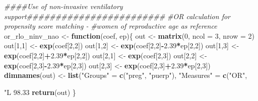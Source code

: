\documentclass[
]{article}
\newenvironment{Shaded}{\begin{snugshade}}{\end{snugshade}}
\newcommand{\CommentTok}[1]{\textcolor[rgb]{0.56,0.35,0.01}{\textit{#1}}}
\newcommand{\ControlFlowTok}[1]{\textcolor[rgb]{0.13,0.29,0.53}{\textbf{#1}}}
\newcommand{\DataTypeTok}[1]{\textcolor[rgb]{0.13,0.29,0.53}{#1}}
\newcommand{\DecValTok}[1]{\textcolor[rgb]{0.00,0.00,0.81}{#1}}
\newcommand{\FloatTok}[1]{\textcolor[rgb]{0.00,0.00,0.81}{#1}}
\newcommand{\KeywordTok}[1]{\textcolor[rgb]{0.13,0.29,0.53}{\textbf{#1}}}
\newcommand{\NormalTok}[1]{#1}
\newcommand{\OperatorTok}[1]{\textcolor[rgb]{0.81,0.36,0.00}{\textbf{#1}}}
\newcommand{\StringTok}[1]{\textcolor[rgb]{0.31,0.60,0.02}{#1}}
\begin{document}
\begin{Shaded}
\begin{Highlighting}[]
\CommentTok{####Use of non-invasive ventilatory support########################}
\CommentTok{#OR calculation for propensity score matching -}
\CommentTok{#women of reproductive age as reference}
\NormalTok{or_rlo_ninv_nao <-}\StringTok{ }\ControlFlowTok{function}\NormalTok{(coef, ep)\{}
\NormalTok{  out <-}\StringTok{ }\KeywordTok{matrix}\NormalTok{(}\DecValTok{0}\NormalTok{, }\DataTypeTok{ncol =} \DecValTok{3}\NormalTok{, }\DataTypeTok{nrow =} \DecValTok{2}\NormalTok{)}
\NormalTok{  out[}\DecValTok{1}\NormalTok{,}\DecValTok{1}\NormalTok{] <-}\StringTok{ }\KeywordTok{exp}\NormalTok{(coef[}\DecValTok{2}\NormalTok{,}\DecValTok{2}\NormalTok{])}
\NormalTok{  out[}\DecValTok{1}\NormalTok{,}\DecValTok{2}\NormalTok{] <-}\StringTok{ }\KeywordTok{exp}\NormalTok{(coef[}\DecValTok{2}\NormalTok{,}\DecValTok{2}\NormalTok{]}\OperatorTok{-}\FloatTok{2.39}\OperatorTok{*}\NormalTok{ep[}\DecValTok{2}\NormalTok{,}\DecValTok{2}\NormalTok{])}
\NormalTok{  out[}\DecValTok{1}\NormalTok{,}\DecValTok{3}\NormalTok{] <-}\StringTok{ }\KeywordTok{exp}\NormalTok{(coef[}\DecValTok{2}\NormalTok{,}\DecValTok{2}\NormalTok{]}\OperatorTok{+}\FloatTok{2.39}\OperatorTok{*}\NormalTok{ep[}\DecValTok{2}\NormalTok{,}\DecValTok{2}\NormalTok{])  }
\NormalTok{  out[}\DecValTok{2}\NormalTok{,}\DecValTok{1}\NormalTok{] <-}\StringTok{ }\KeywordTok{exp}\NormalTok{(coef[}\DecValTok{2}\NormalTok{,}\DecValTok{3}\NormalTok{])}
\NormalTok{  out[}\DecValTok{2}\NormalTok{,}\DecValTok{2}\NormalTok{] <-}\StringTok{ }\KeywordTok{exp}\NormalTok{(coef[}\DecValTok{2}\NormalTok{,}\DecValTok{3}\NormalTok{]}\OperatorTok{-}\FloatTok{2.39}\OperatorTok{*}\NormalTok{ep[}\DecValTok{2}\NormalTok{,}\DecValTok{3}\NormalTok{])}
\NormalTok{  out[}\DecValTok{2}\NormalTok{,}\DecValTok{3}\NormalTok{] <-}\StringTok{ }\KeywordTok{exp}\NormalTok{(coef[}\DecValTok{2}\NormalTok{,}\DecValTok{3}\NormalTok{]}\OperatorTok{+}\FloatTok{2.39}\OperatorTok{*}\NormalTok{ep[}\DecValTok{2}\NormalTok{,}\DecValTok{3}\NormalTok{]) }
  \KeywordTok{dimnames}\NormalTok{(out) <-}\StringTok{ }\KeywordTok{list}\NormalTok{(}\StringTok{"Groups"}\NormalTok{ =}\StringTok{ }\KeywordTok{c}\NormalTok{(}\StringTok{"preg"}\NormalTok{, }\StringTok{"puerp"}\NormalTok{), }
                        \StringTok{"Measures"}\NormalTok{ =}\StringTok{ }\KeywordTok{c}\NormalTok{(}\StringTok{"OR"}\NormalTok{, }\StringTok{"L 98.33%"}\NormalTok{, }\StringTok{"U 98.33%"}\NormalTok{))}
  \KeywordTok{return}\NormalTok{(out)}
\NormalTok{\}}

}
\end{Highlighting}
\end{Shaded}
\end{document}
